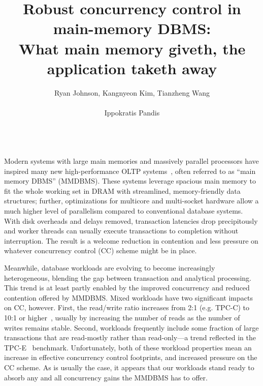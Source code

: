 \documentclass[preprint]{sig-alternate-nocprt}
\begin{document}

\title{Robust concurrency control in main-memory DBMS:\\What main memory giveth, the application taketh away}


\author{
\alignauthor
Ryan Johnson, Kangnyeon Kim, Tianzheng Wang\\
      \\
\alignauthor
Ippokratis Pandis\\
      \\
}

\maketitle

Modern systems with large main memories and massively parallel processors have inspired many new high-performance OLTP systems~\cite{Kallman+08,KemperN11,LarsonBDFPZ11,TuZKLM13}, often referred to as ``main memory DBMS'' (MMDBMS). These systems leverage spacious main memory to fit the whole working set in DRAM with streamlined, memory-friendly data structures; further, optimizations for multicore and multi-socket hardware allow a much higher level of parallelism compared to conventional database systems. With disk overheads and delays removed, transaction latencies drop precipitously and worker threads can usually execute transactions to completion without interruption. The result is a welcome reduction in contention and less pressure on whatever concurrency control (CC) scheme might be in place.

Meanwhile, database workloads are evolving to become increasingly heterogeneous, blending the gap between transaction and analytical processing. This trend is at least partly enabled by the improved concurrency and reduced contention offered by MMDBMS. Mixed workloads have two significant impacts on CC, however. First, the read/write ratio increases from 2:1 (e.g. TPC-C) to 10:1 or higher~\cite{Chen+10,TozunPKJA13}, usually by increasing the number of reads as the number of writes remains stable. Second, workloads frequently include some fraction of large transactions that are read-mostly rather than read-only---a trend reflected in the TPC-E~\cite{TPCE} benchmark. Unfortunately, both of these workload properties mean an increase in effective concurrency control footprints, and increased pressure on the CC scheme. As is usually the case, it appears that our workloads stand ready to absorb any and all concurrency gains the MMDBMS has to offer.
\end{document}
